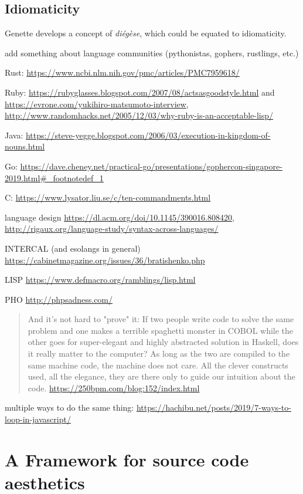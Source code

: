 \subsection{Idiomaticity}
\label{subsec:idiomaticity}

Genette develops a concept of \emph{diégèse}, which could be equated to idiomaticity.

add something about language communities (pythonistas, gophers, rustlings, etc.)

Rust: \url{https://www.ncbi.nlm.nih.gov/pmc/articles/PMC7959618/}

Ruby: \url{https://rubyglasses.blogspot.com/2007/08/actsasgoodstyle.html} and \url{https://evrone.com/yukihiro-matsumoto-interview}, \url{http://www.randomhacks.net/2005/12/03/why-ruby-is-an-acceptable-lisp/}

Java: \url{https://steve-yegge.blogspot.com/2006/03/execution-in-kingdom-of-nouns.html}

Go: \url{https://dave.cheney.net/practical-go/presentations/gophercon-singapore-2019.html#_footnotedef_1}

C: \url{https://www.lysator.liu.se/c/ten-commandments.html}

language design \url{https://dl.acm.org/doi/10.1145/390016.808420}, \url{http://rigaux.org/language-study/syntax-across-languages/}

INTERCAL (and esolangs in general) \url{https://cabinetmagazine.org/issues/36/bratishenko.php}

LISP \url{https://www.defmacro.org/ramblings/lisp.html}

PHO \url{http://phpsadness.com/}

\begin{quote}
    And it's not hard to "prove" it: If two people write code to solve the same problem and one makes a terrible spaghetti monster in COBOL while the other goes for super-elegant and highly abstracted solution in Haskell, does it really matter to the computer? As long as the two are compiled to the same machine code, the machine does not care. All the clever constructs used, all the elegance, they are there only to guide our intuition about the code. \url{https://250bpm.com/blog:152/index.html}
\end{quote}

multiple ways to do the same thing: \url{https://hachibu.net/posts/2019/7-ways-to-loop-in-javascript/}

\section{A Framework for source code aesthetics}
\label{sec:programming-aesthetic-framework}

